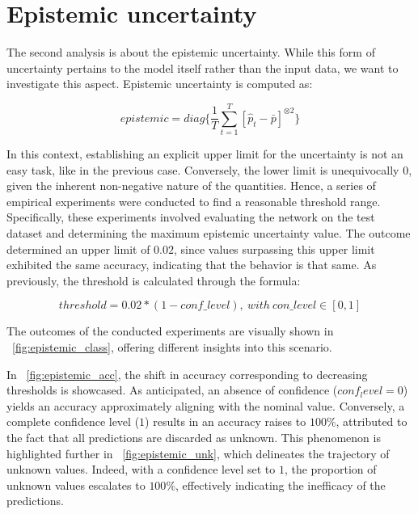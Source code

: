 \section{Epistemic uncertainty}

The second analysis is about the epistemic uncertainty. While this form of uncertainty pertains to the model itself rather than the input data, we want to investigate this aspect. Epistemic uncertainty is computed as:

\[
	epistemic = diag\{\frac{1}{T} \sum_{t=1}^{T} [\hat{p}_t - \bar{p}]^{\otimes 2}\}
\]

In this context, establishing an explicit upper limit for the uncertainty is not an easy task, like in the previous case. Conversely, the lower limit is unequivocally $0$, given the inherent non-negative nature of the quantities. Hence, a series of empirical experiments were conducted to find a reasonable threshold range. Specifically, these experiments involved evaluating the network on the test dataset and determining the maximum epistemic uncertainty value.
The outcome determined an upper limit of $0.02$, since values surpassing this upper limit exhibited the same accuracy, indicating that the behavior is that same. As previously, the threshold is calculated through the formula:

\[
	threshold = 0.02 * (1 - conf \_ level), \ with \ con \_ level \in [0,1]
\]

The outcomes of the conducted experiments are visually shown in \Fig~\ref{fig:epistemic_class}, offering different insights into this scenario.

In \Fig~\ref{fig:epistemic_acc}, the shift in accuracy corresponding to decreasing thresholds is showcased. As anticipated, an absence of confidence ($conf_level = 0$) yields an accuracy approximately aligning with the nominal value. Conversely, a complete confidence level ($1$) results in an accuracy raises to $100\%$, attributed to the fact that all predictions are discarded as unknown. This phenomenon is highlighted further in \Fig~\ref{fig:epistemic_unk}, which delineates the trajectory of unknown values. Indeed, with a confidence level set to $1$, the proportion of unknown values escalates to $100\%$, effectively indicating the inefficacy of the predictions.

